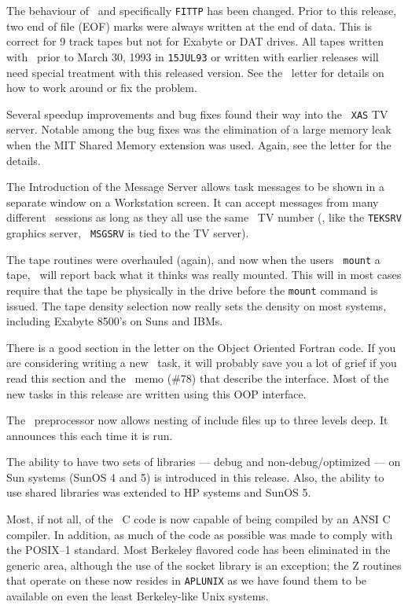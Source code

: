 The behaviour of \AIPS\ and specifically {\tt FITTP} has been changed.
Prior to this release, two end of file (EOF) marks were always written
at the end of data.  This is correct for 9 track tapes but not for
Exabyte or DAT drives.  All tapes written with \AIPS\ prior to March 30,
1993 in {\tt 15JUL93} or written with earlier releases will need special
treatment with this released version.  See the \thisver\ \AIPS letter
for details on how to work around or fix the problem.

Several speedup improvements and bug fixes found their way into the {\tt
XAS} TV server.  Notable among the bug fixes was the elimination of a
large memory leak when the MIT Shared Memory extension was used.  Again,
see the \AIPS letter for the details.

The Introduction of the Message Server allows task messages to be shown
in a separate window on a Workstation screen.  It can accept messages
from many different \AIPS\ sessions as long as they all use the same
\AIPS\ TV number (\ie, like the {\tt TEKSRV} graphics server, {\tt
MSGSRV} is tied to the TV server).

The tape routines were overhauled (again), and now when the users {\tt
mount} a tape, \AIPS\ will report back what it thinks was really
mounted.  This will in most cases require that the tape be physically in
the drive before the {\tt mount} command is issued.  The tape density
selection now really sets the density on most systems, including Exabyte
8500's on Suns and IBMs.

There is a good section in the \AIPS letter on the Object Oriented
Fortran code.  If you are considering writing a new \AIPS\ task, it will
probably save you a lot of grief if you read this section and the
\AIPS\ memo (\#78) that describe the interface.  Most of the new tasks
in this release are written using this OOP interface.

The \AIPS\ preprocessor now allows nesting of include files up to three
levels deep.  It announces this each time it is run.

The ability to have two sets of libraries --- debug and
non-debug/optimized --- on Sun systems (SunOS 4 and 5) is introduced in
this release.  Also, the ability to use shared libraries was extended to
HP systems and SunOS 5.

Most, if not all, of the \AIPS\ C code is now capable of being
compiled by an ANSI C compiler.  In addition, as much of the code as
possible was made to comply with the POSIX--1 standard.  Most Berkeley
flavored code has been eliminated in the generic area, although the use
of the socket library is an exception; the Z routines that operate on
these now resides in {\tt\dol APLUNIX} as we have found them to be
available on even the least Berkeley-like Unix systems.

